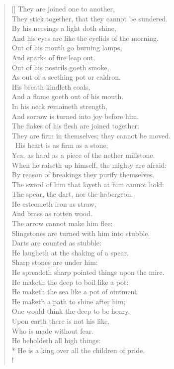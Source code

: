 \documentclass[MAIN]{subfiles}
\begin{document}
\begin{verse}[\versewidth]
They are joined one to another,\\
\vin They stick together, that they cannot be sundered.\\
By his neesings a light doth shine,\\
\vin And his eyes are like the eyelids of the morning.\\
Out of his mouth go burning lamps,\\
\vin And sparks of fire leap out.\\
Out of his nostrils goeth smoke,\\
\vin As out of a seething pot or caldron.\\
His breath kindleth coals,\\
\vin And a flame goeth out of his mouth.\\
In his neck remaineth strength,\\
\vin And sorrow is turned into joy before him.\\
The flakes of his flesh are joined together:\\
\vin They are firm in themselves; they cannot be moved.\\\
His heart is as firm as a stone;\\
\vin Yea, as hard as a piece of the nether millstone.\\
When he raiseth up himself, the mighty are afraid:\\
\vin By reason of breakings they purify themselves.\\
The sword of him that layeth at him cannot hold:\\
\vin The spear, the dart, nor the habergeon.\\
He esteemeth iron as straw,\\
\vin And brass as rotten wood.\\
The arrow cannot make him flee:\\
\vin Slingstones are turned with him into stubble.\\
Darts are counted as stubble:\\
\vin He laugheth at the shaking of a spear.\\
Sharp stones are under him:\\
\vin He spreadeth sharp pointed things upon the mire.\\
He maketh the deep to boil like a pot:\\
\vin He maketh the sea like a pot of ointment.\\
He maketh a path to shine after him;\\
\vin One would think the deep to be hoary.\\
Upon earth there is not his like,\\
\vin Who is made without fear.\\
He beholdeth all high things:\\*
\vin He is a king over all the children of pride.\\!


\end{verse}
\end{document}
